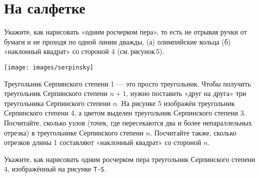 \section{На салфетке}

\begin{enumerate}
\itA Укажите, как нарисовать «одним росчерком пера», то есть не отрывая ручки от бумаги и не проходя по одной линии дважды, (а) олимпийские кольца (б) «наклонный квадрат» со стороной 4 (см.\,рисунок\,5).

\centerline{\texttt{[image: images/serpinsky]}}

\itB Треугольник Серпинского степени 1 — это просто треугольник. Чтобы получить треугольник Серпинского степени $n+1$, нужно поставить «друг на друга» три треугольника Серпинского степени $n$. На рисунке 5 изображён треугольник Серпинского степени 4, а цветом выделен треугольник Серпинского степени 3. Посчитайте, сколько узлов (точек, где пересекаются два и более непараллельных отрезка) в треугольнике Серпинского степени $n$. Посчитайте также, сколько отрезков длины 1 составляют «наклонный квадрат» со стороной $n$.

\itC Укажите, как нарисовать одним росчерком пера треугольник Серпинского степени 4, изображённый на рисунке {\tt T-S}.
\end{enumerate}